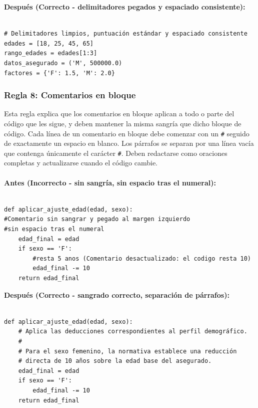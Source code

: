 \documentclass{article}
\begin{document}
        	\textbf{Después (Correcto - delimitadores pegados y espaciado consistente):}
        	\begin{verbatim}

# Delimitadores limpios, puntuación estándar y espaciado consistente
edades = [18, 25, 45, 65]
rango_edades = edades[1:3]
datos_asegurado = ('M', 500000.0)
factores = {'F': 1.5, 'M': 2.0}

        	\end{verbatim}

    	\subsubsection*{Regla 8: Comentarios en bloque}
        	Esta regla explica que los comentarios en bloque aplican a todo o parte del código que les sigue,
			y deben mantener la misma sangría que dicho bloque de código. Cada línea de un comentario en bloque debe 
			comenzar con un \texttt{\#} seguido de exactamente un espacio en blanco. Los párrafos se separan por una línea 
			vacía que contenga únicamente el carácter \texttt{\#}. Deben redactarse como oraciones completas y actualizarse 
			cuando el código cambie.\\ \\
    
        	\textbf{Antes (Incorrecto - sin sangría, sin espacio tras el numeral):}

        	\begin{verbatim}

def aplicar_ajuste_edad(edad, sexo):
#Comentario sin sangrar y pegado al margen izquierdo
#sin espacio tras el numeral
    edad_final = edad
    if sexo == 'F':
        #resta 5 anos (Comentario desactualizado: el codigo resta 10)
        edad_final -= 10
    return edad_final

        \end{verbatim}
    
        	\textbf{Después (Correcto - sangrado correcto, separación de párrafos):}
        	\begin{verbatim}

def aplicar_ajuste_edad(edad, sexo):
    # Aplica las deducciones correspondientes al perfil demográfico.
    #
    # Para el sexo femenino, la normativa establece una reducción
    # directa de 10 años sobre la edad base del asegurado.
    edad_final = edad
    if sexo == 'F':
        edad_final -= 10
    return edad_final

        	\end{verbatim}
\end{document}
